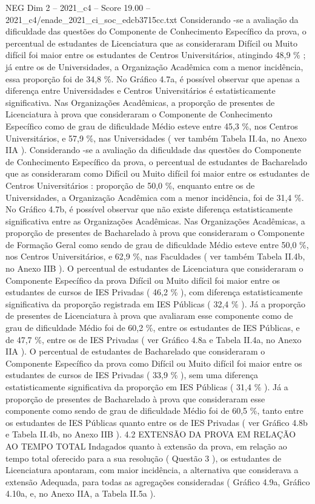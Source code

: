 \begin{textsample}{NEG Dim 2 – 2021\_c4 – Score 19.00 – 2021\_c4/enade\_2021\_ci\_soc\_edcb3715cc.txt}
Considerando -se a avaliação da dificuldade das questões do Componente de Conhecimento Específico da prova, o percentual de estudantes de Licenciatura que as consideraram Difícil ou Muito difícil foi maior entre os estudantes de Centros Universitários, atingindo 48,9 \% ; já entre os de Universidades, a Organização Acadêmica com a menor incidência, essa proporção foi de 34,8 \%.
No Gráfico 4.7a, é possível observar que apenas a diferença entre Universidades e Centros Universitários é estatisticamente significativa.
Nas Organizações Acadêmicas, a proporção de presentes de Licenciatura à prova que consideraram o Componente de Conhecimento Específico como de grau de dificuldade Médio esteve entre 45,3 \%, nos Centros Universitários, e 57,9 \%, nas Universidades ( ver também Tabela II.4a, no Anexo IIA ).
Considerando -se a avaliação da dificuldade das questões do Componente de Conhecimento Específico da prova, o percentual de estudantes de Bacharelado que as consideraram como Difícil ou Muito difícil foi maior entre os estudantes de Centros Universitários : proporção de 50,0 \%, enquanto entre os de Universidades, a Organização Acadêmica com a menor incidência, foi de 31,4 \%.
No Gráfico 4.7b, é possível observar que não existe diferença estatisticamente significativa entre as Organizações Acadêmicas.
Nas Organizações Acadêmicas, a proporção de presentes de Bacharelado à prova que consideraram o Componente de Formação Geral como sendo de grau de dificuldade Médio esteve entre 50,0 \%, nos Centros Universitários, e 62,9 \%, nas Faculdades ( ver também Tabela II.4b, no Anexo IIB ).
O percentual de estudantes de Licenciatura que consideraram o Componente Específico da prova Difícil ou Muito difícil foi maior entre os estudantes de cursos de IES Privadas ( 46,2 \% ), com diferença estatisticamente significativa da proporção registrada em IES Públicas ( 32,4 \% ).
Já a proporção de presentes de Licenciatura à prova que avaliaram esse componente como de grau de dificuldade Médio foi de 60,2 \%, entre os estudantes de IES Públicas, e de 47,7 \%, entre os de IES Privadas ( ver Gráfico 4.8a e Tabela II.4a, no Anexo IIA ).
O percentual de estudantes de Bacharelado que consideraram o Componente Específico da prova como Difícil ou Muito difícil foi maior entre os estudantes de cursos de IES Privadas ( 33,9 \% ), sem uma diferença estatisticamente significativa da proporção em IES Públicas ( 31,4 \% ).
Já a proporção de presentes de Bacharelado à prova que consideraram esse componente como sendo de grau de dificuldade Médio foi de 60,5 \%, tanto entre os estudantes de IES Públicas quanto entre os de IES Privadas ( ver Gráfico 4.8b e Tabela II.4b, no Anexo IIB ). 4.2 EXTENSÃO DA PROVA EM RELAÇÃO AO TEMPO TOTAL Indagados quanto à extensão da prova, em relação ao tempo total oferecido para a sua resolução ( Questão 3 ), os estudantes de Licenciatura apontaram, com maior incidência, a alternativa que considerava a extensão Adequada, para todas as agregações consideradas ( Gráfico 4.9a, Gráfico 4.10a, e, no Anexo IIA, a Tabela II.5a ).

\end{textsample}
